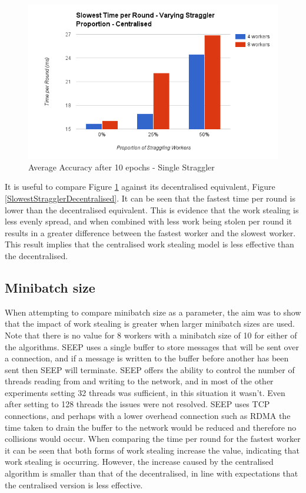 \documentclass[12pt]{article}
\begin{document}
\begin{figure}[H]
  \centering
  \includegraphics[width=6in]{SlowestStragglerCentralised}
  \caption[]{Average Accuracy after 10 epochs - Single Straggler}
  \label{SlowestStragglerCentralised}
\end{figure}

It is useful to compare Figure \ref{SlowestStragglerCentralised} against its decentralised equivalent, Figure \ref{SlowestStragglerDecentralised}. It can be seen that the fastest time per round is lower than the decentralised equivalent. This is evidence that the work stealing is less evenly spread, and when combined with less work being stolen per round it results in a greater difference between the fastest worker and the slowest worker. This result implies that the centralised work stealing model is less effective than the decentralised.

\subsection{Minibatch size} \label{size}

When attempting to compare minibatch size as a parameter, the aim was to show that the impact of work stealing is greater when larger minibatch sizes are used. Note that there is no value for 8 workers with a minibatch size of 10 for either of the algorithms. SEEP uses a single buffer to store messages that will be sent over a connection, and if a message is written to the buffer before another has been sent then SEEP will terminate. SEEP offers the ability to control the number of threads reading from and writing to the network, and in most of the other experiments setting 32 threads was sufficient, in this situation it wasn't. Even after setting to 128 threads the issues were not resolved. SEEP uses TCP connections, and perhaps with a lower overhead connection such as RDMA the time taken to drain the buffer to the network would be reduced and therefore no collisions would occur.
\newline
\newline
When comparing the time per round for the fastest worker it can be seen that both forms of work stealing increase the value, indicating that work stealing is occurring. However, the increase caused by the centralised algorithm is smaller than that of the decentralised, in line with expectations that the centralised version is less effective.
\end{document}
